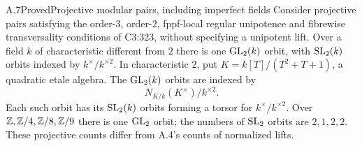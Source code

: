 \begin{statement}{A.7}{Proved}{Projective modular pairs, including imperfect fields}
Consider projective pairs satisfying the order-$3$, order-$2$,
fppf-local regular unipotence and fibrewise transversality conditions
of C3:323, without specifying a unipotent lift. Over a field $k$ of
characteristic different from $2$ there is one $\operatorname{GL}_2(k)$ orbit,
with $\operatorname{SL}_2(k)$ orbits indexed by $k^\times/k^{\times2}$.
In characteristic $2$, put $K=k[T]/(T^2+T+1)$, a quadratic etale
algebra. The $\operatorname{GL}_2(k)$ orbits are indexed by
\[
 N_{K/k}(K^\times)/k^{\times2}.
\]
Each such orbit has its $\operatorname{SL}_2(k)$ orbits forming a torsor for
$k^\times/k^{\times2}$. Over $\mathbb Z,\mathbb Z/4,\mathbb Z/8,\mathbb Z/9$ there is one
$\operatorname{GL}_2$ orbit; the numbers of $\operatorname{SL}_2$ orbits are $2,1,2,2$.
These projective counts differ from A.4's counts of normalized lifts.
\end{statement}
